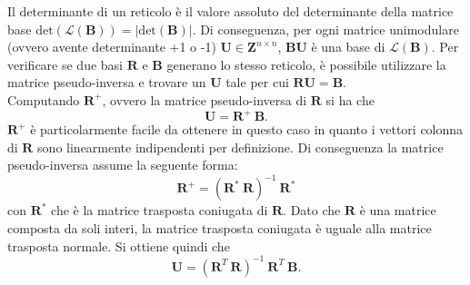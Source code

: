 Il determinante di un reticolo è il valore assoluto del 
determinante della matrice base 
$\text{det}(\mathcal{L}(\mathbf{B})) = |\text{det}(\mathbf{B})|$. 
Di conseguenza, per ogni matrice unimodulare (ovvero avente determinante +1 o -1) 
$\mathbf{U} \in \mathbf{Z}^{n \times n}$, $\mathbf{B}\mathbf{U}$ è una base di 
$\mathcal{L}(\mathbf{B})$. Per verificare se due basi $\mathbf{R}$ e $\mathbf{B}$ generano
lo stesso reticolo, è possibile utilizzare la matrice pseudo-inversa e trovare un $\mathbf{U}$
tale per cui $\mathbf{R}\mathbf{U} = \mathbf{B}$.
\\
Computando $\mathbf{R}^+$, ovvero la matrice pseudo-inversa di $\mathbf{R}$ si ha che
\[
    \mathbf{U} = \mathbf{R}^+ \ \mathbf{B}.
\]
$\mathbf{R}^+$ è particolarmente facile da ottenere in questo caso in quanto i vettori
colonna di $\mathbf{R}$ sono linearmente indipendenti per definizione. Di conseguenza la
matrice pseudo-inversa assume la seguente forma:
\[
    \mathbf{R}^+ = (\mathbf{R}^* \ \mathbf{R})^{-1} \ \mathbf{R}^*
\]
con $\mathbf{R}^*$ che è la matrice trasposta coniugata di $\mathbf{R}$. Dato che $\mathbf{R}$
è una matrice composta da soli interi, la matrice trasposta coniugata è uguale alla matrice
trasposta normale. Si ottiene quindi che
\[
    \mathbf{U} = (\mathbf{R}^T \ \mathbf{R})^{-1} \ \mathbf{R}^T \ \mathbf{B}.
\]

